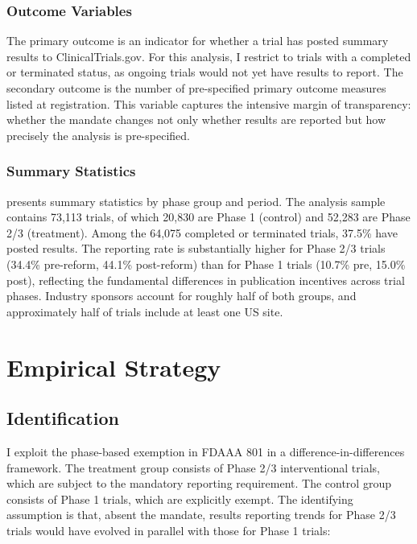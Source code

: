 \documentclass[12pt]{article}
\begin{document}
\subsubsection*{Outcome Variables} The primary outcome is an indicator for whether a trial has posted summary results to ClinicalTrials.gov. For this analysis, I restrict to trials with a completed or terminated status, as ongoing trials would not yet have results to report. The secondary outcome is the number of pre-specified primary outcome measures listed at registration. This variable captures the intensive margin of transparency: whether the mandate changes not only whether results are reported but how precisely the analysis is pre-specified.

\subsubsection*{Summary Statistics}  presents summary statistics by phase group and period. The analysis sample contains 73,113 trials, of which 20,830 are Phase 1 (control) and 52,283 are Phase 2/3 (treatment). Among the 64,075 completed or terminated trials, 37.5\% have posted results. The reporting rate is substantially higher for Phase 2/3 trials (34.4\% pre-reform, 44.1\% post-reform) than for Phase 1 trials (10.7\% pre, 15.0\% post), reflecting the fundamental differences in publication incentives across trial phases. Industry sponsors account for roughly half of both groups, and approximately half of trials include at least one US site.



\section{Empirical Strategy}

\subsection{Identification}

I exploit the phase-based exemption in FDAAA 801 in a difference-in-differences framework. The treatment group consists of Phase 2/3 interventional trials, which are subject to the mandatory reporting requirement. The control group consists of Phase 1 trials, which are explicitly exempt. The identifying assumption is that, absent the mandate, results reporting trends for Phase 2/3 trials would have evolved in parallel with those for Phase 1 trials:
\end{document}
